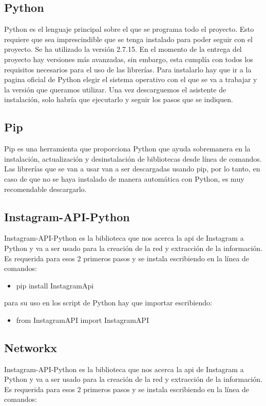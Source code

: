 \subsection{Python}
Python es el lenguaje principal sobre el que se programa todo el proyecto. Esto requiere que sea imprescindible que se tenga instalado para poder seguir con el proyecto. Se ha utilizado la versión 2.7.15. En el momento de la entrega del proyecto hay versiones más avanzadas, sin embargo, esta cumplía con todos los requisitos necesarios para el uso de las librerías.
Para instalarlo hay que ir a la pagina oficial de Python\cite{python} elegir el sistema operativo con el que se va a trabajar y la versión que queramos utilizar. Una vez descarguemos el asistente de instalación, solo habría que ejecutarlo y seguir los pasos que se indiquen.

\subsection{Pip}
Pip es una herramienta que proporciona Python que ayuda sobremanera en la instalación, actualización y desinstalación de bibliotecas desde línea de comandos. Las librerías que se van a usar van a ser descargadas usando pip, por lo tanto, en caso de que no se haya instalado de manera automática con Python, es muy recomendable descargarlo.

\subsection{Instagram-API-Python}\cite{git-API-python}
Instagram-API-Python es la biblioteca que nos acerca la api de Instagram a Python y va a ser usado para la creación de la red y extracción de la información. Es requerida para esos 2 primeros pasos y se instala escribiendo en la línea de comandos:

\begin{itemize}
    \item pip install InstagramApi
\end{itemize}

para su uso en los script de Python hay que importar escribiendo:

\begin{itemize}
    \item from InstagramAPI import InstagramAPI
\end{itemize}

\subsection{Networkx}\cite{networkx}
Instagram-API-Python es la biblioteca que nos acerca la api de Instagram a Python y va a ser usado para la creación de la red y extracción de la información. Es requerida para esos 2 primeros pasos y se instala escribiendo en la línea de comandos:


